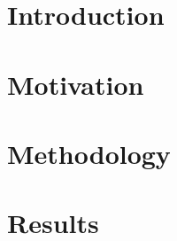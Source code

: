 \documentclass[xcolor={rgb}]{beamer}
\begin{document}
\begin{frame}
\titlepage
\end{frame}

\section{Introduction}
\begin{frame}
\end{frame}
\begin{frame}
\end{frame}
\begin{frame}
\end{frame}

\section{Motivation}
\begin{frame}
\end{frame}
\begin{frame}
\end{frame}
\begin{frame}
\end{frame}
\begin{frame}
\end{frame}

\section{Methodology}
\begin{frame}
\end{frame}
\begin{frame}
\end{frame}
\begin{frame}
\end{frame}
\begin{frame}
\end{frame}


\section{Results}
\begin{frame}
\end{frame}
\begin{frame}
\end{frame}
\begin{frame}
\end{frame}
\end{document}
